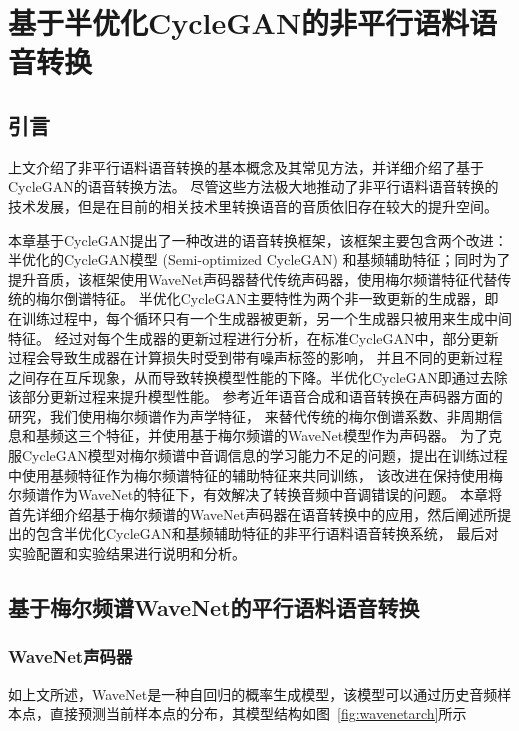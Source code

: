 \chapter{基于半优化CycleGAN的非平行语料语音转换}

\section{引言}
上文介绍了非平行语料语音转换的基本概念及其常见方法，并详细介绍了基于CycleGAN的语音转换方法。
尽管这些方法极大地推动了非平行语料语音转换的技术发展，但是在目前的相关技术里转换语音的音质依旧存在较大的提升空间。

本章基于CycleGAN提出了一种改进的语音转换框架，该框架主要包含两个改进：半优化的CycleGAN模型 (Semi-optimized CycleGAN) 
和基频辅助特征；同时为了提升音质，该框架使用WaveNet声码器替代传统声码器，使用梅尔频谱特征代替传统的梅尔倒谱特征。
半优化CycleGAN主要特性为两个非一致更新的生成器，即在训练过程中，每个循环只有一个生成器被更新，另一个生成器只被用来生成中间特征。
经过对每个生成器的更新过程进行分析，在标准CycleGAN中，部分更新过程会导致生成器在计算损失时受到带有噪声标签的影响，
并且不同的更新过程之间存在互斥现象，从而导致转换模型性能的下降。半优化CycleGAN即通过去除该部分更新过程来提升模型性能。
参考近年语音合成和语音转换在声码器方面的研究，我们使用梅尔频谱作为声学特征，
来替代传统的梅尔倒谱系数、非周期信息和基频这三个特征，并使用基于梅尔频谱的WaveNet模型作为声码器。
为了克服CycleGAN模型对梅尔频谱中音调信息的学习能力不足的问题，提出在训练过程中使用基频特征作为梅尔频谱特征的辅助特征来共同训练，
该改进在保持使用梅尔频谱作为WaveNet的特征下，有效解决了转换音频中音调错误的问题。
本章将首先详细介绍基于梅尔频谱的WaveNet声码器在语音转换中的应用，然后阐述所提出的包含半优化CycleGAN和基频辅助特征的非平行语料语音转换系统，
最后对实验配置和实验结果进行说明和分析。

\section{基于梅尔频谱WaveNet的平行语料语音转换}
\subsection{WaveNet声码器}
如上文所述，WaveNet是一种自回归的概率生成模型，该模型可以通过历史音频样本点，直接预测当前样本点的分布，其模型结构如图~\ref{fig:wavenetarch}所示

